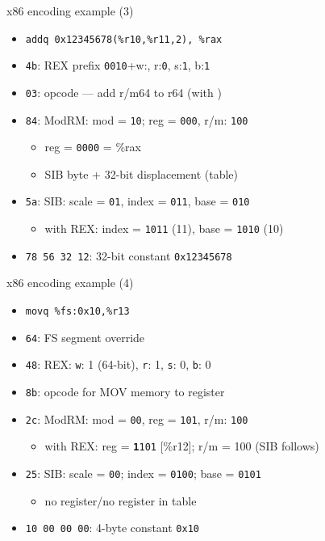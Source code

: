 \begin{frame}[fragile,label=x86ex3]{x86 encoding example (3)}
    \begin{itemize}
    \item \lstinline|addq 0x12345678(%r10,%r11,2), %rax|
    \item {\tt 4b}: REX prefix {\tt 0010}+w:{\tt {}}, r:{\tt \textcolor{orange!80!black}{0}}, s:{\tt \textcolor{blue!80!black}{1}}, b:{\tt \textcolor{green!80!black}{1}}
    \item {\tt 03}: opcode --- add r/m64 to r64 (with )
    \item {\tt 84}: ModRM: mod = {\tt 10}; reg = {\tt 000}, r/m: {\tt 100}
        \begin{itemize}
        \item reg = {\tt \textcolor{orange!80!black}{0}000} = \%rax
        \item SIB byte + 32-bit displacement (table)
        \end{itemize}
    \item {\tt 5a}: SIB: scale = {\tt 01}, index = {\tt 011}, base = {\tt 010}
        \begin{itemize}
        \item with REX: index = {\tt \textcolor{blue!80!black}{1}011} (11), base = {\tt \textcolor{green!80!black}{1}010} (10)
        \end{itemize}
    \item {\tt 78 56 32 12}: 32-bit constant {\tt 0x12345678}
    \end{itemize}
\end{frame}

\begin{frame}[fragile,label=x86ex4]{x86 encoding example (4)}
    \begin{itemize}
    \item \lstinline|movq %fs:0x10,%r13|
    \item {\tt 64}: FS segment override
    \item {\tt 48}: REX: {\tt w}: 1 (64-bit), {\tt r}: \textcolor{orange!80!black}{1}, {\tt s}: \textcolor{blue!80!black}{0}, {\tt b}: \textcolor{green!80!black}{0}
    \item {\tt 8b}: opcode for MOV memory to register
    \item {\tt 2c}: ModRM: mod = {\tt 00}, reg = {\tt 101}, r/m: {\tt 100}
        \begin{itemize}
        \item with REX: reg = {\tt \textbf{\textcolor{orange!80!black}{1}}101} [\%r12]; r/m = {100} (SIB follows)
        \end{itemize}
    \item {\tt 25}: SIB: scale = {\tt 00}; index = {\tt \textcolor{blue!80!black}{0}100}; base = {\tt \textcolor{green!80!black}{0}101}
        \begin{itemize}
        \item no register/no register in table
        \end{itemize}
    \item {\tt 10 00 00 00}: 4-byte constant {\tt 0x10}
    \end{itemize}
\end{frame}

